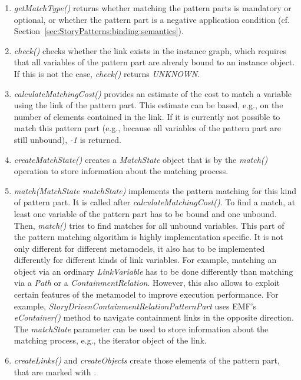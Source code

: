 \begin{enumerate}
	\item \emph{getMatchType()} returns whether matching the pattern parts is mandatory or optional, or whether the pattern part is a negative application condition (cf. Section~\ref{sec:StoryPatterns:binding:semantics}). 
	
	\item \emph{check()} checks whether the link exists in the instance graph, which requires that all variables of the pattern part are already bound to an instance object. 
	If this is not the case, \emph{check()} returns \emph{UNKNOWN}. 

	\item \emph{calculateMatchingCost()} provides an estimate of the cost to match a variable using the link of the pattern part. 
	This estimate can be based, e.g., on the number of elements contained in the link.
	If it is currently not possible to match this pattern part (e.g., because all variables of the pattern part are still unbound), \emph{-1} is returned.

	\item \emph{createMatchState()} creates a \emph{MatchState} object that is by the \emph{match()} operation to store information about the matching process.

	\item \emph{match(MatchState matchState)} implements the pattern matching for this kind of pattern part. 
	It is called after \emph{calculateMatchingCost()}. 
	To find a match, at least one variable of the pattern part has to be bound and one unbound. 
	Then, \emph{match()} tries to find matches for all unbound variables. 
	This part of the pattern matching algorithm is highly implementation specific. 
	It is not only different for different metamodels,
	it also has to be implemented differently for different kinds of link variables.
	For example, matching an object via an ordinary \emph{LinkVariable} has to be done differently than matching via a \emph{Path} or a \emph{ContainmentRelation}.
	However, this also allows to exploit certain features of the metamodel to improve execution performance. 
	For example, \emph{StoryDrivenContainmentRelationPatternPart} uses EMF's \emph{eContainer()} method to navigate containment links in the opposite direction.	
	The \emph{matchState} parameter can be used to store information about the matching process, e.g., the iterator object of the link.
	
	\item \emph{createLinks()} and \emph{createObjects} create those elements of the pattern part, that are marked with \create.
	

\end{enumerate}
